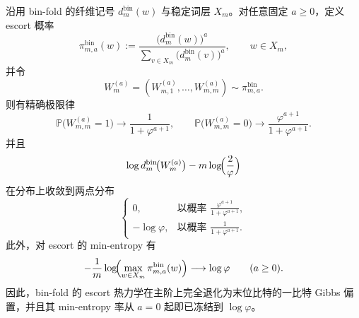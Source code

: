 \begin{theorem}[bin-fold escort 族的一比特 Gibbs 化与从 \texorpdfstring{$a=0$}{a=0} 即开始的冻结]\label{thm:gut-foldbin-escort-one-bit-gibbs-freezing}
沿用 bin-fold 的纤维记号 \(d_m^{\mathrm{bin}}(w)\) 与稳定词层 \(X_m\)。对任意固定 \(a\ge 0\)，定义 escort 概率
\[
\pi_{m,a}^{\mathrm{bin}}(w):=
\frac{\bigl(d_m^{\mathrm{bin}}(w)\bigr)^a}{\sum_{v\in X_m}\bigl(d_m^{\mathrm{bin}}(v)\bigr)^a},
\qquad
w\in X_m,
\]
并令
\[
W_m^{(a)}=(W^{(a)}_{m,1},\dots,W^{(a)}_{m,m})\sim \pi_{m,a}^{\mathrm{bin}}.
\]
则有精确极限律
\[
\mathbb{P}\bigl(W^{(a)}_{m,m}=1\bigr)\longrightarrow \frac{1}{1+\varphi^{a+1}},
\qquad
\mathbb{P}\bigl(W^{(a)}_{m,m}=0\bigr)\longrightarrow \frac{\varphi^{a+1}}{1+\varphi^{a+1}}.
\]
并且
\[
\log d_m^{\mathrm{bin}}\!\bigl(W_m^{(a)}\bigr)-m\log\!\Bigl(\frac{2}{\varphi}\Bigr)
\]
在分布上收敛到两点分布
\[
\begin{cases}
0,& \text{以概率 }\displaystyle \frac{\varphi^{a+1}}{1+\varphi^{a+1}},\\[8pt]
-\log\varphi,& \text{以概率 }\displaystyle \frac{1}{1+\varphi^{a+1}}.
\end{cases}
\]
此外，对 escort 的 min-entropy 有
\[
-\frac1m\log\!\Bigl(\max_{w\in X_m}\pi_{m,a}^{\mathrm{bin}}(w)\Bigr)\longrightarrow \log\varphi
\qquad (a\ge 0).
\]
因此，bin-fold 的 escort 热力学在主阶上完全退化为末位比特的一比特 Gibbs 偏置，并且其 min-entropy 率从 \(a=0\) 起即已冻结到 \(\log\varphi\)。
\end{theorem}
